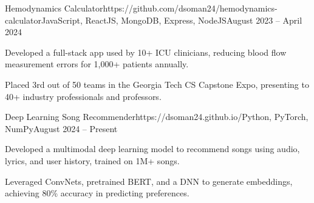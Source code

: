 \documentclass{article}
\begin{document}
\begin{flushleft}

    \vspace{3pt}

    \begin{project}{Hemodynamics Calculator}{https://github.com/dsoman24/hemodynamics-calculator}{JavaScript, ReactJS, MongoDB, Express, NodeJS}{August 2023 -- April 2024}
        \item Developed a full-stack app used by 10+ ICU clinicians, reducing blood flow measurement errors for 1,000+ patients annually.
        \item Placed 3rd out of 50 teams in the Georgia Tech CS Capstone Expo, presenting to 40+ industry professionals and professors.
    \end{project}


    \begin{project}{Deep Learning Song Recommender}{https://dsoman24.github.io/}{Python, PyTorch, NumPy}{August 2024 -- Present}
        \item Developed a multimodal deep learning model to recommend songs using audio, lyrics, and user history, trained on 1M+ songs.
        \item Leveraged ConvNets, pretrained BERT, and a DNN to generate embeddings, achieving 80\% accuracy in predicting preferences.
    \end{project}


    \vspace{3pt}
     \\
     \\
     \\

\end{flushleft}
\end{document}
